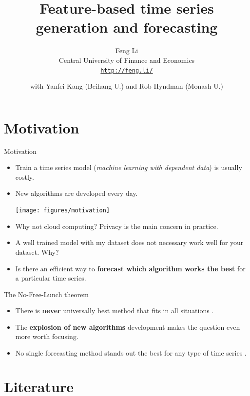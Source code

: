 \documentclass[11pt,ignorenonframetext,compress]{beamer}
\institute{}
\title{Feature-based time series generation and forecasting}
\subtitle{\vspace{1cm}Feng Li\\ Central University of Finance and Economics\\\texttt{\url{http://feng.li/}}}
\author{with Yanfei Kang (Beihang U.) and Rob Hyndman (Monash U.)}
\date{}
\begin{document}
\frame{\titlepage}

\section{Motivation}\label{motivation}

\begin{frame}{Motivation}

  \begin{itemize}
  \item Train a time series model (\emph{machine learning with dependent data}) is usually
    costly.

  \item New algorithms are developed every day.

  \centerline{\texttt{[image: figures/motivation]}}


  \item Why not cloud computing? Privacy is the main concern in practice.

  \item A well trained model with my dataset does not necessary work well for your dataset. Why?

  \item Is there an efficient way to \textbf{forecast which algorithm works the best} for
    a particular time series.

  \end{itemize}


\end{frame}

\begin{frame}{The No-Free-Lunch theorem}

  \begin{itemize}
  \item
    There is \textbf{never} universally best method that fits in all situations
    \citep{wolpert1996lack}.
  \item
    The \textbf{explosion of new algorithms} development makes the question even
    more worth focusing.
  \item
    No single forecasting method stands out the best for any type of time
    series \citep{adam1973individual}.
  \end{itemize}


\end{frame}

\section{Literature}\label{literature}
\end{document}
